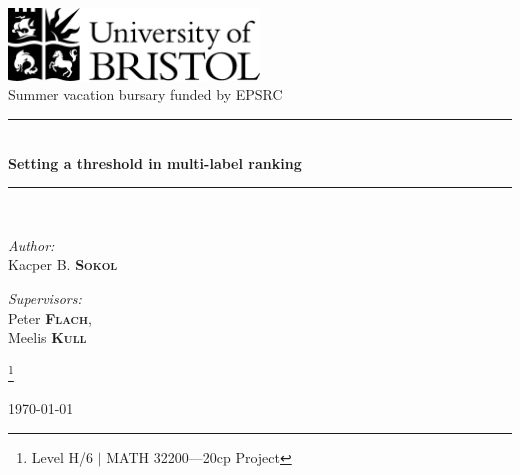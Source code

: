 \documentclass[12pt, a4paper, pdflatex, leqno, twoside]{report}
\newcommand{\HRule}{\rule{\linewidth}{0.5mm}}
\begin{document}
\begin{titlepage}
\begin{center}
\includegraphics[width=0.5\textwidth]{graphics/UOB-logo.png}~\\[2.5cm]

Summer vacation bursary funded by EPSRC\\

\HRule \\[0.4cm]
{ \huge \bfseries %
  Setting a threshold in multi-label ranking
}
\HRule \\[1.5cm]

\begin{minipage}{0.4\textwidth}
\begin{flushleft} \large
\emph{Author:}\\
Kacper B. \textsc{\textbf{Sokol}}
\end{flushleft}
\end{minipage}
\begin{minipage}{0.4\textwidth}
\begin{flushright} \large
\emph{Supervisors:} \\
Peter \textsc{\textbf{Flach}},\\
Meelis \textsc{\textbf{Kull}}
\end{flushright}
\end{minipage}

\let\thefootnote\relax\footnote{Level H/6 $|$ MATH 32200---20cp Project}

\vfill

{\large \today}
\end{center}
\end{titlepage}


\newpage
\thispagestyle{empty}
\mbox{}
\end{document}
